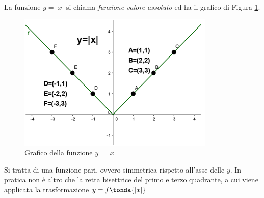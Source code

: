 La funzione $y=|x|$ si chiama \emph{funzione valore assoluto} ed ha il grafico di Figura \ref{fig:abs_imm2}.
\begin{figure}[h]
\begin{center}
\begin{inaccessibleblock}[TODO]
\includegraphics[width=0.5\linewidth]{img/imm2} %
\caption{Grafico della funzione $y = |x|$}
\label{fig:abs_imm2}
\end{inaccessibleblock}
\end{center}
\end{figure}
Si tratta di una funzione pari, ovvero simmetrica rispetto all'asse delle $y$. In pratica non è altro che
la retta bisettrice del primo e terzo quadrante, a cui viene applicata la trasformazione $y = f\tonda{|x|}$


